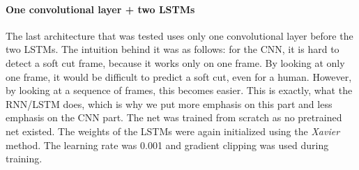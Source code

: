 \paragraph{One convolutional layer + two LSTMs}
The last architecture that was tested uses only one convolutional layer before the two LSTMs.
The intuition behind it was as follows: for the CNN, it is hard to detect a soft cut frame, because it works only on one frame.
By looking at only one frame, it would be difficult to predict a soft cut, even for a human.
However, by looking at a sequence of frames, this becomes easier.
This is exactly, what the RNN/LSTM does, which is why we put more emphasis on this part and less emphasis on the CNN part.
The net was trained from scratch as no pretrained net existed.
The weights of the LSTMs were again initialized using the \textit{Xavier} method.
The learning rate was 0.001 and gradient clipping was used during training.

